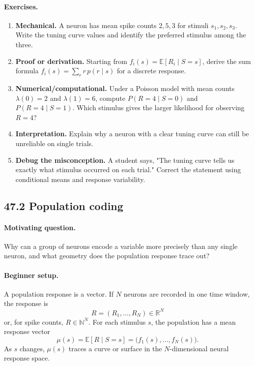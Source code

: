 \paragraph{Exercises.}
\begin{enumerate}[label=\textbf{47.1.\arabic*.}, leftmargin=*]
\item \textbf{Mechanical.} A neuron has mean spike counts \(2,5,3\) for stimuli \(s_1,s_2,s_3\). Write the tuning curve values and identify the preferred stimulus among the three.
\item \textbf{Proof or derivation.} Starting from \(f_i(s)=\mathbb E[R_i\mid S=s]\), derive the sum formula \(f_i(s)=\sum_r r\,p(r\mid s)\) for a discrete response.
\item \textbf{Numerical/computational.} Under a Poisson model with mean counts \(\lambda(0)=2\) and \(\lambda(1)=6\), compute \(P(R=4\mid S=0)\) and \(P(R=4\mid S=1)\). Which stimulus gives the larger likelihood for observing \(R=4\)?
\item \textbf{Interpretation.} Explain why a neuron with a clear tuning curve can still be unreliable on single trials.
\item \textbf{Debug the misconception.} A student says, "The tuning curve tells us exactly what stimulus occurred on each trial." Correct the statement using conditional means and response variability.
\end{enumerate}

\subsection{47.2 Population coding}

\paragraph{Motivating question.}
Why can a group of neurons encode a variable more precisely than any single neuron, and what geometry does the population response trace out?

\paragraph{Beginner setup.}
A population response is a vector. If \(N\) neurons are recorded in one time window, the response is
\[
R=(R_1,\ldots,R_N)\in\mathbb R^N
\]
or, for spike counts, \(R\in\mathbb N^N\). For each stimulus \(s\), the population has a mean response vector
\[
\mu(s)=\mathbb E[R\mid S=s]
=\bigl(f_1(s),\ldots,f_N(s)\bigr).
\]
As \(s\) changes, \(\mu(s)\) traces a curve or surface in the \(N\)-dimensional neural response space.


